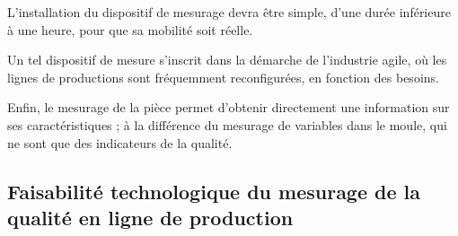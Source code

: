 L'installation du dispositif de mesurage devra être simple, d'une durée inférieure à une heure, pour que sa mobilité soit réelle.

Un tel dispositif de mesure s'inscrit dans la démarche de l'industrie agile, où les lignes de productions sont fréquemment reconfigurées, en fonction des besoins.

Enfin, le mesurage de la pièce permet d'obtenir directement une information sur ses caractéristiques ; à la différence du mesurage de variables dans le moule, qui ne sont que des indicateurs de la qualité.

\subsection{Faisabilité technologique du mesurage de la qualité en ligne de production}
%
